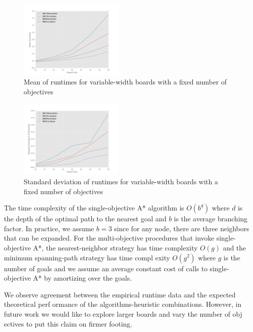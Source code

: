 \documentclass[12pt, conference, compsocconf]{IEEEtran}
\begin{document}
\begin{figure}[h!]
    \centering
    \includegraphics[width=0.45\textwidth]{runtimes.png}
    \caption{Mean of runtimes for variable-width boards with a fixed number of objectives}
    \label{runtimes-fig}
\end{figure}

\begin{figure}[h!]
    \centering
    \includegraphics[width=0.45\textwidth]{variability.png}
    \caption{Standard deviation of runtimes for variable-width boards with a fixed number of objectives}
    \label{variability-fig}
\end{figure}

The time complexity of the single-objective A* algorithm is $O(b^d)$ where $d$
is the depth of the optimal path to the nearest goal and $b$ is the average
branching factor.  In practice, we assume $b = 3$ since for any node, there are
three neighbors that can be expanded.  For the multi-objective procedures that
invoke single-objective A*, the nearest-neighbor strategy has time complexity
$O(g)$ and the minimum spanning-path strategy has time compl exity $O(g^2)$
where $g$ is the number of goals and we assume an average constant cost of
calls to single-objective A* by amortizing over the goals.

We observe agreement between the empirical runtime data and the expected
theoretical perf ormance of the algorithms-heuristic combinations.  However, in
future work we would like to explore larger boards and vary the number of obj
ectives to put this claim on firmer footing.
\end{document}
